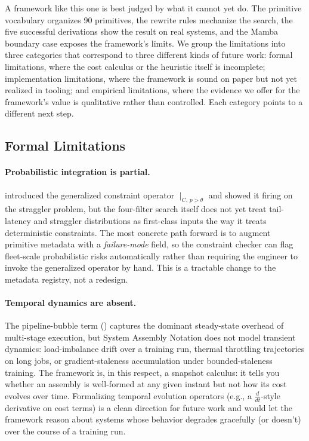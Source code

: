 \documentclass[10pt,twocolumn]{article}
\begin{document}
A framework like this one is best judged by what it cannot yet do. The primitive vocabulary organizes 90 primitives, the rewrite rules mechanize the search, the five successful derivations show the result on real systems, and the Mamba boundary case exposes the framework's limits. We group the limitations into three categories that correspond to three different kinds of future work: formal limitations, where the cost calculus or the heuristic itself is incomplete; implementation limitations, where the framework is sound on paper but not yet realized in tooling; and empirical limitations, where the evidence we offer for the framework's value is qualitative rather than controlled. Each category points to a different next step.

\subsection{Formal Limitations}


\paragraph{Probabilistic integration is partial.}  introduced the generalized constraint operator $\mid_{C,\, p > \theta}$ and showed it firing on the straggler problem, but the four-filter search itself does not yet treat tail-latency and straggler distributions as first-class inputs the way it treats deterministic constraints. The most concrete path forward is to augment primitive metadata with a \emph{failure-mode} field, so the constraint checker can flag fleet-scale probabilistic risks automatically rather than requiring the engineer to invoke the generalized operator by hand. This is a tractable change to the metadata registry, not a redesign.

\paragraph{Temporal dynamics are absent.} The pipeline-bubble term () captures the dominant steady-state overhead of multi-stage execution, but System Assembly Notation does not model transient dynamics: load-imbalance drift over a training run, thermal throttling trajectories on long jobs, or gradient-staleness accumulation under bounded-staleness training. The framework is, in this respect, a snapshot calculus: it tells you whether an assembly is well-formed at any given instant but not how its cost evolves over time. Formalizing temporal evolution operators (e.g., a $\frac{d}{dt}$-style derivative on cost terms) is a clean direction for future work and would let the framework reason about systems whose behavior degrades gracefully (or doesn't) over the course of a training run.
\end{document}
